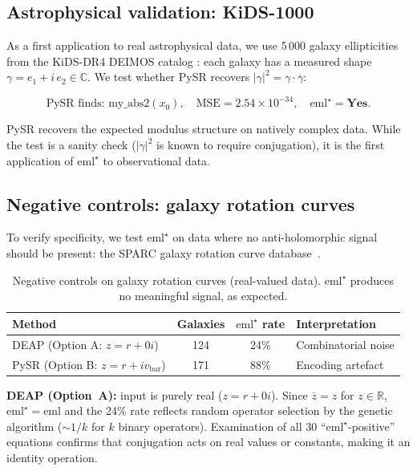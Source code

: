 \documentclass[12pt,a4paper]{article}
\newcommand{\emlstar}{\mathrm{eml}^{\star}}
\newcommand{\eml}{\mathrm{eml}}
\newcommand{\conj}[1]{\overline{#1}}
\begin{document}
\subsection{Astrophysical validation: KiDS-1000}
\label{sec:kids}

As a first application to real astrophysical data, we use 5\,000
galaxy ellipticities from the KiDS-DR4 DEIMOS catalog
\citep{giblin2021kids1000}: each galaxy has a measured shape
$\gamma = e_1 + i\,e_2 \in \mathbb{C}$.
We test whether PySR recovers $|\gamma|^2 = \gamma \cdot \conj{\gamma}$:

\begin{equation}
\text{PySR finds: } \mathrm{my\_abs2}(x_0), \quad
\mathrm{MSE} = 2.54 \times 10^{-34}, \quad \emlstar = \textbf{Yes}.
\end{equation}

PySR recovers the expected modulus structure on natively complex data.
While the test is a sanity check ($|\gamma|^2$ is known to
require conjugation), it is the first application of $\emlstar$
to observational data.


\subsection{Negative controls: galaxy rotation curves}
\label{sec:negative}

To verify specificity, we test $\emlstar$ on data where no
anti-holomorphic signal should be present: the SPARC galaxy
rotation curve database~\citep{lelli2016sparc}.

\begin{table}[h]
\centering
\caption{Negative controls on galaxy rotation curves (real-valued data).
$\emlstar$ produces no meaningful signal, as expected.}
\label{tab:negative}
\begin{tabular}{lccl}
\toprule
Method & Galaxies & $\emlstar$ rate & Interpretation \\
\midrule
DEAP (Option A: $z = r + 0i$) & 124 & 24\% & Combinatorial noise \\
PySR (Option B: $z = r + iv_{\mathrm{bar}}$) & 171 & 88\% & Encoding artefact \\
\bottomrule
\end{tabular}
\end{table}

\textbf{DEAP (Option~A):} input is purely real ($z = r + 0i$).
Since $\conj{z} = z$ for $z \in \mathbb{R}$, $\emlstar = \eml$
and the 24\% rate reflects random operator selection by the
genetic algorithm ($\sim 1/k$ for $k$ binary operators).
Examination of all 30 ``$\emlstar$-positive'' equations confirms
that conjugation acts on real values or constants, making it an
identity operation.
\end{document}
